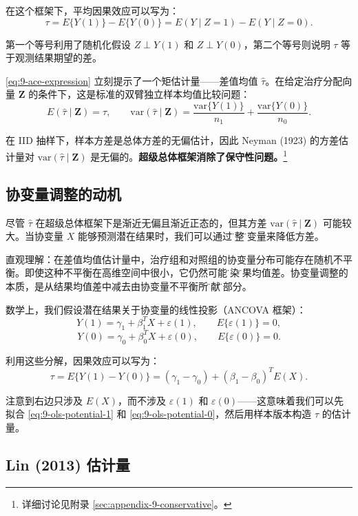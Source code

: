 在这个框架下，平均因果效应可以写为：
\[
\tau = E\{Y(1)\} - E\{Y(0)\} = E(Y \mid Z=1) - E(Y \mid Z=0).
\label{eq:9-ace-expression}
\]

第一个等号利用了随机化假设 $Z \perp Y(1)$ 和 $Z \perp Y(0)$，第二个等号则说明 $\tau$ 等于观测结果期望的差。

\cref{eq:9-ace-expression} 立刻提示了一个矩估计量——差值均值 $\hat{\tau}$。在给定治疗分配向量 $\mathbf{Z}$ 的条件下，这是标准的双臂独立样本均值比较问题：
\[
E(\hat{\tau} \mid \mathbf{Z}) = \tau,
\qquad
\mathrm{var}(\hat{\tau} \mid \mathbf{Z}) = \frac{\mathrm{var}\{Y(1)\}}{n_1} + \frac{\mathrm{var}\{Y(0)\}}{n_0}.
\label{eq:9-neraman-variance}
\]

在 IID 抽样下，样本方差是总体方差的无偏估计，因此 Neyman (1923) 的方差估计量对 $\mathrm{var}(\hat{\tau} \mid \mathbf{Z})$ 是无偏的。\textbf{超级总体框架消除了保守性问题。}\footnote{详细讨论见附录 \cref{sec:appendix-9-conservative}。}

\subsection{协变量调整的动机}\label{sec:9-covariate-adjustment-motivation}

尽管 $\hat{\tau}$ 在超级总体框架下是渐近无偏且渐近正态的，但其方差 $\mathrm{var}(\hat{\tau} \mid \mathbf{Z})$ 可能较大。当协变量 $X$ 能够预测潜在结果时，我们可以通过\"调整\"协变量来降低方差。

直观理解：在差值均值估计量中，治疗组和对照组的协变量分布可能存在随机不平衡。即使这种不平衡在高维空间中很小，它仍然可能\"污染\"结果均值差。协变量调整的本质，是从结果均值差中减去由协变量不平衡所\"贡献\"的部分。

数学上，我们假设潜在结果关于协变量的线性投影（ANCOVA 框架）：
\[
Y(1) = \gamma_1 + \beta_1^T X + \varepsilon(1), \qquad E\{\varepsilon(1)\} = 0,
\label{eq:9-ols-potential-1}
\]
\[
Y(0) = \gamma_0 + \beta_0^T X + \varepsilon(0), \qquad E\{\varepsilon(0)\} = 0.
\label{eq:9-ols-potential-0}
\]

利用这些分解，因果效应可以写为：
\[
\tau = E\{Y(1) - Y(0)\} = (\gamma_1 - \gamma_0) + (\beta_1 - \beta_0)^T E(X).
\label{eq:9-ace-decomposition}
\]

注意到右边只涉及 $E(X)$，而不涉及 $\varepsilon(1)$ 和 $\varepsilon(0)$——这意味着我们可以先拟合 \cref{eq:9-ols-potential-1} 和 \cref{eq:9-ols-potential-0}，然后用样本版本构造 $\tau$ 的估计量。

\subsection{Lin (2013) 估计量}\label{sec:9-lin-estimator}


